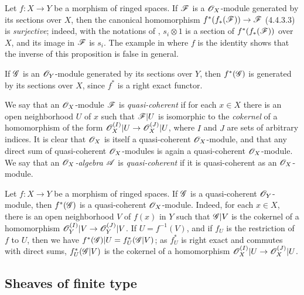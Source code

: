 \begin{env}[5.1.2]
\label{0.5.1.2}
Let $f:X\to Y$ be a morphism of ringed spaces.
If $\mathscr{F}$ is a $\mathscr{O}_X$-module generated by its sections over $X$, then the canonical homomorphism $f^*(f_*(\sh{F}))\to\sh{F}$ (4.4.3.3) is \emph{surjective};
indeed, with the notations of , $s_i\otimes 1$ is a section of $f^*(f_*(\mathscr{F}))$ over $X$, and its image in $\mathscr{F}$ is $s_i$.
The example in  where $f$ is the identity shows that the inverse of this proposition is false in general.

If $\mathscr{G}$ is an $\mathscr{O}_Y$-module generated by its sections over $Y$, then $f^*(\mathscr{G})$ is generated by its sections over $X$, since $f^*$ is a right exact functor.
\end{env}

\begin{env}[5.1.3]
\label{0.5.1.3}
We say that an $\mathscr{O}_X$-module $\mathscr{F}$ is \emph{quasi-coherent} if for each $x\in X$ there is an open neighborhood $U$ of $x$ such that $\mathscr{F}|U$ is isomorphic to the \emph{cokernel} of a homomorphism of the form $\OO_X^{(I)}|U\to\OO_X^{(J)}|U$, where $I$ and $J$ are sets of arbitrary indices.
It is clear that $\mathscr{O}_X$ is itself a quasi-coherent $\mathscr{O}_X$-module, and that any direct sum of quasi-coherent $\mathscr{O}_X$-modules is again a quasi-coherent $\mathscr{O}_X$-module.
We say that an \emph{$\mathscr{O}_X$-algebra $\mathscr{A}$} is \emph{quasi-coherent} if it is quasi-coherent as an $\mathscr{O}_X$-module.
\end{env}

\begin{env}[5.1.4]
\label{0.5.1.4}
Let $f:X\to Y$ be a morphism of ringed spaces.
If $\mathscr{G}$ is a quasi-coherent $\mathscr{O}_Y$-module, then $f^*(\mathscr{G})$ is a quasi-coherent $\mathscr{O}_X$-module.
Indeed, for each $x\in X$, there is an open neighborhood $V$ of $f(x)$ in $Y$ such that $\mathscr{G}|V$ is the cokernel of a homomorphism $\OO_Y^{(I)}|V\to\OO_Y^{(J)}|V$.
If $U=f^{-1}(V)$, and if $f_U$ is the restriction of $f$ to $U$, then we have $f^*(\mathscr{G})|U=f_U^*(\mathscr{G}|V)$;
as $f_U^*$ is right exact and commutes with direct sums, $f_U^*(\mathscr{G}|V)$ is the cokernel of a homomorphism $\OO_X^{(I)}|U\to\OO_X^{(J)}|U$.
\end{env}

\subsection{Sheaves of finite type}
\label{subsection:sheaves-of-finite-type}

